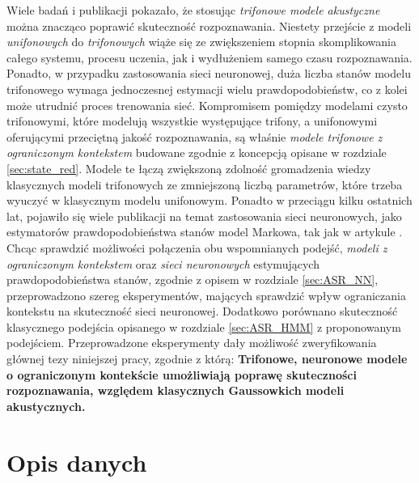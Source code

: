 \documentclass[shortabstract, mgr]{iithesis}
\begin{document}
	Wiele badań i publikacji pokazało, że stosując \textit{trifonowe modele akustyczne} można znacząco poprawić skuteczność rozpoznawania. Niestety przejście z modeli \textit{unifonowych} do \textit{trifonowych} wiąże się ze zwiększeniem stopnia skomplikowania całego systemu, procesu uczenia, jak i wydłużeniem samego czasu rozpoznawania. Ponadto, w przypadku zastosowania sieci neuronowej, duża liczba stanów modelu trifonowego wymaga jednoczesnej estymacji wielu prawdopodobieństw, co z kolei może utrudnić proces trenowania sieć. Kompromisem pomiędzy modelami czysto trifonowymi, które modelują wszystkie występujące trifony, a unifonowymi oferującymi przeciętną jakość rozpoznawania, są właśnie \textit{modele trifonowe z ograniczonym kontekstem} budowane zgodnie z koncepcją opisane w rozdziale \ref{sec:state_red}. Modele te łączą zwiększoną zdolność gromadzenia wiedzy klasycznych modeli trifonowych ze zmniejszoną liczbą parametrów, które trzeba wyuczyć w klasycznym modelu unifonowym. Ponadto w przeciągu kilku ostatnich lat, pojawiło się wiele publikacji na temat zastosowania sieci neuronowych, jako estymatorów prawdopodobieństwa stanów model Markowa, tak jak w artykule \cite{article1}. Chcąc sprawdzić możliwości połączenia obu wspomnianych podejść, \textit{modeli z ograniczonym kontekstem} oraz \textit{sieci neuronowych} estymujących prawdopodobieństwa stanów, zgodnie z opisem w rozdziale \ref{sec:ASR_NN}, przeprowadzono szereg eksperymentów, mających sprawdzić wpływ ograniczania kontekstu na skuteczność sieci neuronowej. Dodatkowo porównano skuteczność klasycznego podejścia opisanego w rozdziale \ref{sec:ASR_HMM} z proponowanym podejściem. Przeprowadzone eksperymenty dały możliwość zweryfikowania głównej tezy niniejszej pracy, zgodnie z którą: \textbf{Trifonowe, neuronowe modele o ograniczonym kontekście umożliwiają poprawę skuteczności rozpoznawania, względem klasycznych Gaussowkich modeli akustycznych.}
	
	\section{ Opis danych}
	\label{sec:opis_danych}
	
\end{document}
